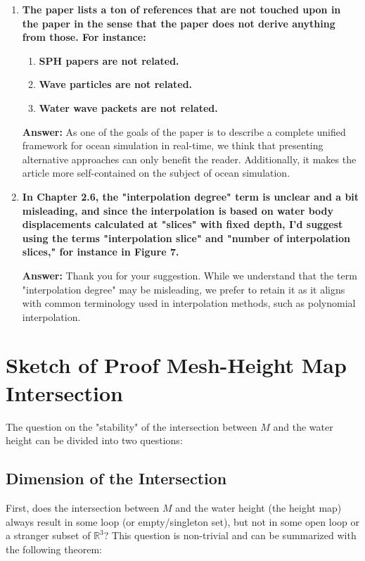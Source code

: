 \documentclass{article}
\newcommand{\answer}[1]{\textbf{\textcolor{answercolor}{Answer:}} \textcolor{answercolor}{#1}}
\begin{document}
\begin{enumerate}[label=\textbf{\arabic*.}]
	\item \textbf{The paper lists a ton of references that are not touched upon in the paper in the sense that the paper does not derive anything from those. For instance:}

	      \begin{enumerate}[label=\textbf{\arabic*.}]
		      \item \textbf{SPH papers are not related.}
		      \item \textbf{Wave particles are not related.}
		      \item \textbf{Water wave packets are not related.}
	      \end{enumerate}

	      \answer{As one of the goals of the paper is to describe a complete unified framework for ocean simulation in real-time, we think that presenting alternative approaches can only benefit the reader. Additionally, it makes the article more self-contained on the subject of ocean simulation.}

	\item \textbf{In Chapter 2.6, the "interpolation degree" term is unclear and a bit misleading, and since the interpolation is based on water body displacements calculated at "slices" with fixed depth, I'd suggest using the terms "interpolation slice" and "number of interpolation slices," for instance in Figure 7.}

	      \answer{Thank you for your suggestion. While we understand that the term "interpolation degree" may be misleading, we prefer to retain it as it aligns with common terminology used in interpolation methods, such as polynomial interpolation.}
\end{enumerate}

\appendix

\section{Sketch of Proof Mesh-Height Map Intersection}
\label{sec:sketch_of_proof_mesh_height_map_intersection}

The question on the "stability" of the intersection between $M$ and the water height can be divided into two questions:

\subsection{Dimension of the Intersection}

First, does the intersection between $M$ and the water height (the height map) always result in some loop (or empty/singleton set), but not in some open loop or a stranger subset of $\mathbb{R}^3$? This question is non-trivial and can be summarized with the following theorem:
\end{document}
